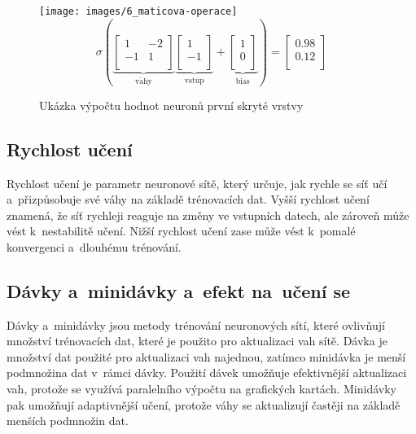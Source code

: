 \begin{figure}[ht]
    \onehalfspacing
    \centering
    \texttt{[image: images/6\_maticova-operace]}
    $$
        \sigma \left(
        \underbrace{
            \left[ \begin{matrix}
                1  & -2 \\
                -1 & 1  \\
            \end{matrix} \right]
        }_{\mathrm{v\acute{a}hy}}
        \underbrace{
            \left[ \begin{matrix}
                1  \\
                -1 \\
            \end{matrix} \right]
        }_{\mathrm{vstup}} +
        \underbrace{
            \left[ \begin{matrix}
                1 \\
                0 \\
            \end{matrix} \right]
        }_{\mathrm{bias}}
        \right) = \left[ \begin{matrix}
                0.98 \\
                0.12 \\
            \end{matrix} \right]
    $$
    \caption{Ukázka výpočtu hodnot neuronů první skryté vrstvy}
\end{figure}
\FloatBarrier

\subsection{Rychlost učení}

Rychlost učení je parametr neuronové sítě, který určuje, jak rychle se síť učí a~přizpůsobuje své váhy na základě trénovacích dat. Vyšší rychlost učení znamená, že síť rychleji reaguje na změny ve vstupních datech, ale zároveň může vést k~nestabilitě učení. Nižší rychlost učení zase může vést k~pomalé konvergenci a~dlouhému trénování.

\subsection{Dávky a~minidávky a~efekt na~učení se}

Dávky a~minidávky jsou metody trénování neuronových sítí, které ovlivňují množství trénovacích dat, které je použito pro aktualizaci vah sítě. Dávka je množství dat použité pro aktualizaci vah najednou, zatímco minidávka je menší podmnožina dat v~rámci dávky. Použití dávek umožňuje efektivnější aktualizaci vah, protože se využívá paralelního výpočtu na grafických kartách. Minidávky pak umožňují adaptivnější učení, protože váhy se aktualizují častěji na základě menších podmnožin dat.


